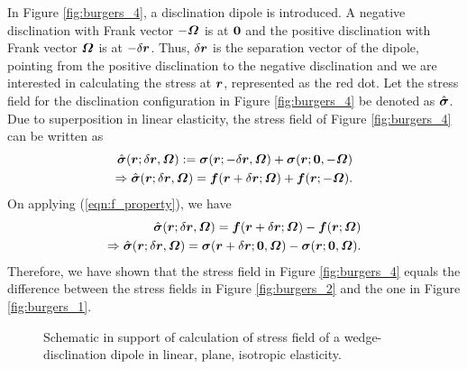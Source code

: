 \documentclass[11pt,letterpaper]{article}
\begin{document}
In Figure \ref{fig:burgers_4}, a disclination dipole is introduced. A negative disclination with Frank vector $-\bfOmega$ is at $\bf0$ and the positive disclination with Frank vector $\bfOmega$ is at $-\delta \bfr$. Thus, $\delta\bfr$ is the separation vector of the dipole, pointing from the positive disclination to the negative disclination and we are interested in calculating the stress at $\bfr$, represented as the red dot. Let the stress field for the disclination configuration in Figure \ref{fig:burgers_4} be denoted as $\hat{\bfsigma}$. Due to superposition in linear elasticity, the stress field of Figure \ref{fig:burgers_4} can be written as
\begin{eqnarray*}
\hat{\bfsigma}(\bfr;\delta\bfr, \bfOmega) := \bfsigma(\bfr;-\delta\bfr,\bfOmega) + \bfsigma(\bfr; \bf0, -\bfOmega) \\
\Rightarrow \hat{\bfsigma}(\bfr;\delta\bfr, \bfOmega) = \bff(\bfr+\delta\bfr;\bfOmega) + \bff(\bfr; -\bfOmega).
\end{eqnarray*}
On applying (\ref{eqn:f_property}), we have
\begin{eqnarray}
\hat{\bfsigma}(\bfr;\delta\bfr, \bfOmega) = \bff(\bfr+\delta\bfr;\bfOmega) - \bff(\bfr; \bfOmega)  \nonumber \\
\Rightarrow \hat{\bfsigma}(\bfr;\delta\bfr, \bfOmega) = \bfsigma(\bfr+\delta\bfr;\bf0, \bfOmega) - \bfsigma(\bfr;\bf0, \bfOmega).  \label{eqn:stress_difference}
\end{eqnarray}
Therefore, we have shown that the stress field in Figure \ref{fig:burgers_4} equals the difference between the stress fields in Figure \ref{fig:burgers_2} and the one in Figure \ref{fig:burgers_1}. 
\begin{figure}
\centering
{}\qquad
{}
\qquad
{}
\caption{Schematic in support of calculation of stress field of a wedge-disclination dipole in linear, plane, isotropic elasticity. }
\label{fig:burgers}
\end{figure}
\end{document}
